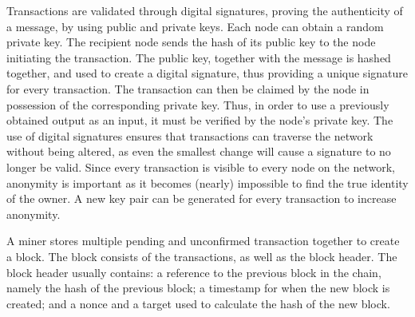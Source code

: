Transactions are validated through digital signatures, proving the authenticity of a message, by using public and private keys. Each node can obtain a random private key.  The recipient node sends the hash of its public key to the node initiating the transaction. The public key, together with the message is hashed together, and used to create a digital signature, thus providing a unique signature for every transaction. %
The transaction can then be claimed by the node in possession of the corresponding private key. Thus, in order to use a previously obtained output as an input, it must be verified by the node's private key. The use of digital signatures ensures that transactions can traverse the network without being altered, as even the smallest change will cause a signature to no longer be valid. Since every transaction is visible to every node on the network, anonymity is important as it becomes (nearly) \cite{ip} impossible to find the true identity of the owner. A new key pair can be generated for every transaction to increase anonymity.

A miner stores multiple pending and unconfirmed transaction together to create a block. The block consists of the transactions, as well as the block header. The block header usually contains: a reference to the previous block in the chain, namely the hash of the previous block; a timestamp for when the new block is created; and a nonce and a target used to calculate the hash of the new block. 

